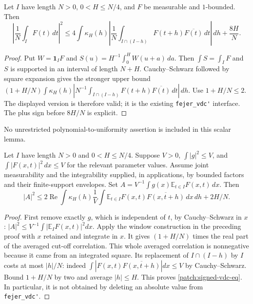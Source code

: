 \documentclass[11pt]{article}
\theoremstyle{definition}
\newcommand{\pid}[1]{\nolinkurl{#1}}
\begin{document}
\begin{lemma}\label{lem:fejer-vdc}
Let $I$ have length $N>0$, $0<H\leq N/4$, and $F$ be measurable and $1$-bounded.  Then
\[
 \left|\frac1N\int_I F(t)\,dt\right|^2
 \leq4\int\kappa_H(h)
       \left|\frac1N\int_{I\cap(I-h)}F(t+h)\overline{F(t)}\,dt\right|\,dh
       +\frac{8H}{N}.
\]
\end{lemma}
\begin{proof}
Put $W=\mathbf1_IF$ and $S(u)=H^{-1}\int_0^H W(u+a)\,da$.
Then $\int S=\int_I F$ and $S$ is supported in an interval of length $N+H$.
Cauchy--Schwarz followed by square expansion gives the stronger upper bound
$(1+H/N)\int\kappa_H(h)|N^{-1}\int_{I\cap(I-h)}F(t+h)\overline{F(t)}\,dt|\,dh$.
Use $1+H/N\leq2$.  The displayed version is therefore valid; it is the existing
\pid{fejer_vdc'} interface.  The plus sign before $8H/N$ is explicit.
\end{proof}
No unrestricted polynomial-to-uniformity assertion is included in this scalar lemma.

\begin{lemma}\label{patch:signed-vdc}
Let $I$ have length $N>0$ and $0<H\leq N/4$.  Suppose $V>0$, $\int|g|^2\leq V$, and $\int|F(x,t)|^2\,dx\leq V$ for the relevant
parameter values.  Assume joint measurability and the integrability supplied, in applications,
by bounded factors and their finite-support envelopes.  Set
$A=V^{-1}\int g(x)\mathbb E_{t\in I}F(x,t)\,dx$.  Then
\[
 \label{patch:signed-vdc-eq}
 |A|^2\leq2\operatorname{Re}\int\kappa_H(h)
      \frac1V\int\mathbb E_{t\in I}F(x,t)\overline{F(x,t+h)}\,dx\,dh
      +2H/N.
 \tag{\theequation}
\]
\end{lemma}
\begin{proof}
First remove exactly $g$, which is independent of $t$, by Cauchy--Schwarz in $x$:
$|A|^2\leq V^{-1}\int|\mathbb E_I F(x,t)|^2dx$.
Apply the window construction in the preceding proof with $x$ retained and integrate in $x$.
It gives $(1+H/N)$ times the real part of the averaged cut-off correlation.  This whole
averaged correlation is nonnegative because it came from an integrated square.
Its replacement of $I\cap(I-h)$ by $I$ costs at most $|h|/N$: indeed
$\int|F(x,t)\overline{F(x,t+h)}|dx\leq V$ by Cauchy--Schwarz.
Bound $1+H/N$ by two and average $|h|\leq H$.
This proves \eqref{patch:signed-vdc-eq}.  In particular, it is not obtained by deleting an
absolute value from \pid{fejer_vdc'}.
\end{proof}
\end{document}
